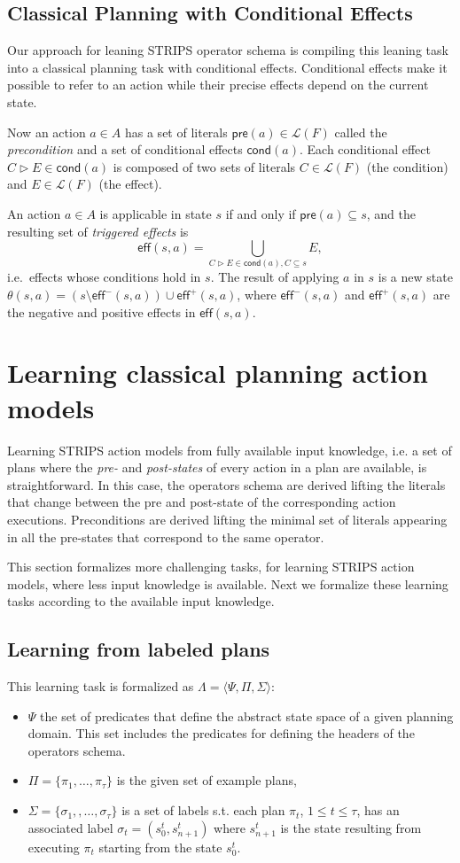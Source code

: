 \documentclass[letterpaper]{article} %
\newcommand{\tup}[1]{{\langle #1 \rangle}}
\newcommand{\pre}{\mathsf{pre}}     %
\newcommand{\eff}{\mathsf{eff}}     %
\newcommand{\cond}{\mathsf{cond}}   %
\begin{document}
\subsection{Classical Planning with Conditional Effects}
Our approach for leaning STRIPS operator schema is compiling this leaning task into a classical planning task with conditional effects. Conditional effects make it possible to refer to an action while their precise effects depend on the current state.

Now an action $a\in A$ has a set of literals $\pre(a)\in\mathcal{L}(F)$ called the {\em precondition} and a set of conditional effects $\cond(a)$. Each conditional effect $C\rhd E\in\cond(a)$ is composed of two sets of literals $C\in\mathcal{L}(F)$ (the condition) and $E\in\mathcal{L}(F)$ (the effect).

An action $a\in A$ is applicable in state $s$ if and only if $\pre(a)\subseteq s$, and the resulting set of {\em triggered effects} is
\[
\eff(s,a)=\bigcup_{C\rhd E\in\cond(a),C\subseteq s} E,
\]
i.e.~effects whose conditions hold in $s$. The result of applying $a$ in $s$ is a new state $\theta(s,a)=(s\setminus \eff^-(s,a))\cup\eff^+(s,a)$, where $\eff^-(s,a)$ and $\eff^+(s,a)$ are the negative and positive effects in $\eff(s,a)$.


\section{Learning classical planning action models}
Learning STRIPS action models from fully available input knowledge, i.e. a set of plans where the {\em pre-} and {\em post-states} of every action in a plan are available, is straightforward. In this case, the operators schema are derived lifting the literals that change between the pre and post-state of the corresponding action executions. Preconditions are derived lifting the minimal set of literals appearing in all the pre-states that correspond to the same operator.

This section formalizes more challenging tasks, for learning STRIPS action models, where less input knowledge is available. Next we formalize these learning tasks according to the available input knowledge.

\subsection{Learning from labeled plans}
This learning task is formalized as $\Lambda=\tup{\Psi,\Pi,\Sigma}$: 
\begin{itemize}
\item $\Psi$ the set of predicates that define the abstract state space of a given planning domain. This set includes the predicates for defining the headers of the operators schema.
\item $\Pi=\{\pi_1,\ldots,\pi_{\tau}\}$ is the given set of example plans,
\item $\Sigma=\{\sigma_1,,\ldots,\sigma_{\tau}\}$ is a set of labels s.t. each plan $\pi_t$, {\small $1\leq t\leq \tau$}, has an associated label $\sigma_t=(s_0^t,s_{n+1}^t)$ where $s_{n+1}^t$ is the state resulting from executing $\pi_t$ starting from the state $s_0^t$. 
\end{itemize}
\end{document}
